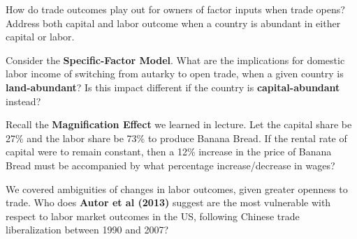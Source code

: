 \documentclass[12pt]{exam}
\begin{document}
\begin{questions}

\newpage 

\question[8]
How do trade outcomes play out for owners of factor inputs when trade opens? 
Address both capital and labor outcome when a country is abundant in either capital or labor.

\question[6]
Consider the \textbf{Specific-Factor Model}. 
What are the implications for domestic labor income of switching from autarky to open trade, when a given country is \textbf{land-abundant}?
Is this impact different if the country is \textbf{capital-abundant} instead?

\newpage 

\question[8]
Recall the \textbf{Magnification Effect} we learned in lecture.
Let the capital share be 27\% and the labor share be 73\% to produce Banana Bread.
If the rental rate of capital were to remain constant, then a 12\% increase in the price of Banana Bread must be accompanied by what percentage increase/decrease in wages?

\question[4]
We covered ambiguities of changes in labor outcomes, given greater openness to trade. 
Who does \textbf{Autor et al (2013)} suggest are the most vulnerable with respect to labor market outcomes in the US, following Chinese trade liberalization between 1990 and 2007?

\end{questions}
\end{document}
